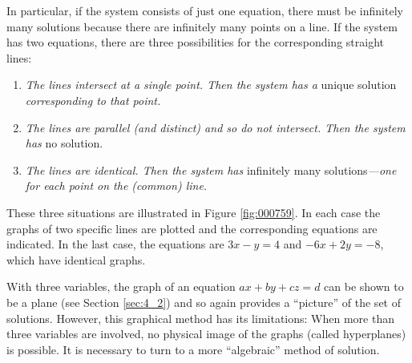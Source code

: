 In particular, if the system consists of just one equation, there must be infinitely many solutions because there are infinitely many points on a line. If the system has two equations, there are three possibilities for the corresponding straight lines:

\begin{enumerate}
\item \textit{The lines intersect at a single point. Then the system has a} unique solution \textit{corresponding to that point.}

\item \textit{The lines are parallel (and distinct) and so do not intersect. Then the system has} no solution.

\item \textit{The lines are identical. Then the system has} infinitely many solutions\textit{---one for each point on the (common) line.}

\end{enumerate}

These three situations are illustrated in Figure \ref{fig:000759}. In each case the graphs of two specific lines are plotted and the corresponding equations are indicated. In the last case, the equations are $3x - y = 4$ and $-6x + 2y = -8$, which have identical graphs.

With three variables, the graph of an equation $ax + by + cz = d$ can be shown to be a plane (see Section \ref{sec:4_2}) and so again provides a ``picture'' of the set of solutions. However, this graphical method has its limitations: When more than three variables are involved, no physical image of the graphs (called hyperplanes) is possible. It is necessary to turn to a more ``algebraic'' method of solution.

